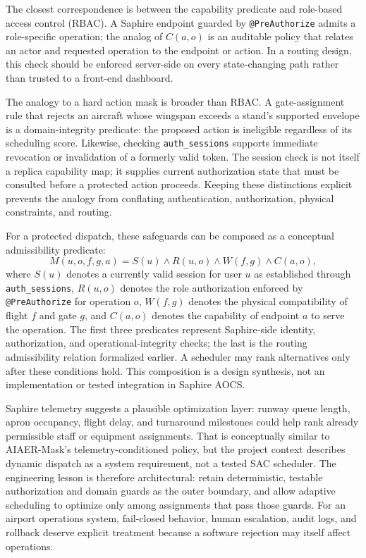 \documentclass[conference]{IEEEtran}
\begin{document}
The closest correspondence is between the capability predicate and role-based access control (RBAC). A Saphire endpoint guarded by \texttt{@PreAuthorize} admits a role-specific operation; the analog of $C(a,o)$ is an auditable policy that relates an actor and requested operation to the endpoint or action. In a routing design, this check should be enforced server-side on every state-changing path rather than trusted to a front-end dashboard.

The analogy to a hard action mask is broader than RBAC. A gate-assignment rule that rejects an aircraft whose wingspan exceeds a stand's supported envelope is a domain-integrity predicate: the proposed action is ineligible regardless of its scheduling score. Likewise, checking \texttt{auth\_sessions} supports immediate revocation or invalidation of a formerly valid token. The session check is not itself a replica capability map; it supplies current authorization state that must be consulted before a protected action proceeds. Keeping these distinctions explicit prevents the analogy from conflating authentication, authorization, physical constraints, and routing.

For a protected dispatch, these safeguards can be composed as a conceptual admissibility predicate:
\begin{equation}
M(u,o,f,g,a)=S(u)\land R(u,o)\land W(f,g)\land C(a,o),
\label{eq:saphire-mask}
\end{equation}
where $S(u)$ denotes a currently valid session for user $u$ as established through \texttt{auth\_sessions}, $R(u,o)$ denotes the role authorization enforced by \texttt{@PreAuthorize} for operation $o$, $W(f,g)$ denotes the physical compatibility of flight $f$ and gate $g$, and $C(a,o)$ denotes the capability of endpoint $a$ to serve the operation. The first three predicates represent Saphire-side identity, authorization, and operational-integrity checks; the last is the routing admissibility relation formalized earlier. A scheduler may rank alternatives only after these conditions hold. This composition is a design synthesis, not an implementation or tested integration in Saphire AOCS.

Saphire telemetry suggests a plausible optimization layer: runway queue length, apron occupancy, flight delay, and turnaround milestones could help rank already permissible staff or equipment assignments. That is conceptually similar to AIAER-Mask's telemetry-conditioned policy, but the project context describes dynamic dispatch as a system requirement, not a tested SAC scheduler. The engineering lesson is therefore architectural: retain deterministic, testable authorization and domain guards as the outer boundary, and allow adaptive scheduling to optimize only among assignments that pass those guards. For an airport operations system, fail-closed behavior, human escalation, audit logs, and rollback deserve explicit treatment because a software rejection may itself affect operations.
\end{document}
